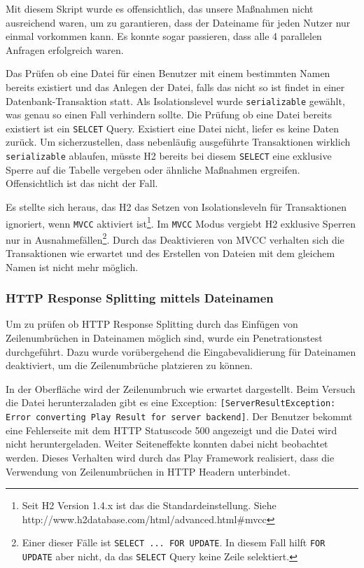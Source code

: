 \documentclass[12pt,DIV14,BCOR10mm,a4paper,parskip=half-,headsepline,headinclude,english,ngerman,bibliography=totocnumbered]{scrreprt}
\begin{document}
Mit diesem Skript wurde es offensichtlich, das unsere Maßnahmen nicht ausreichend waren, um zu garantieren, dass der Dateiname für jeden Nutzer nur einmal vorkommen kann. Es konnte sogar passieren, dass alle 4 parallelen Anfragen erfolgreich waren.

Das Prüfen ob eine Datei für einen Benutzer mit einem bestimmten Namen bereits existiert und das Anlegen der Datei, falls das nicht so ist findet in einer Datenbank-Transaktion statt. Als Isolationslevel wurde \texttt{serializable} gewählt, was genau so einen Fall verhindern sollte. Die Prüfung ob eine Datei bereits existiert ist ein \texttt{SELCET} Query. Existiert eine Datei nicht, liefer es keine Daten zurück. Um sicherzustellen, dass nebenläufig ausgeführte Transaktionen wirklich \texttt{serializable} ablaufen, müsste H2 bereits bei diesem \texttt{SELECT} eine exklusive Sperre auf die Tabelle vergeben oder ähnliche Maßnahmen ergreifen. Offensichtlich ist das nicht der Fall.

Es stellte sich heraus, das H2 das Setzen von Isolationsleveln für Transaktionen ignoriert, wenn \texttt{MVCC} aktiviert ist\footnote{Seit H2 Version 1.4.x ist das die Standardeinstellung. Siehe http://www.h2database.com/html/advanced.html\#mvcc}. Im \texttt{MVCC} Modus vergiebt  H2 exklusive Sperren nur in Ausnahmefällen\footnote{Einer dieser Fälle ist \texttt{SELECT ... FOR UPDATE}. In diesem Fall hilft \texttt{FOR UPDATE} aber nicht, da das \texttt{SELECT} Query keine Zeile selektiert.}. Durch das Deaktivieren von MVCC verhalten sich die Transaktionen wie erwartet und des Erstellen von Dateien mit dem gleichem Namen ist nicht mehr möglich.


\subsubsection{HTTP Response Splitting mittels Dateinamen}
Um zu prüfen ob HTTP Response Splitting durch das Einfügen von Zeilenumbrüchen in Dateinamen möglich sind, wurde ein Penetrationstest durchgeführt. Dazu wurde vorübergehend die Eingabevalidierung für Dateinamen deaktiviert, um die Zeilenumbrüche platzieren zu können.

In der Oberfläche wird der Zeilenumbruch wie erwartet dargestellt. Beim Versuch die Datei herunterzaladen gibt es eine Exception: \texttt{[ServerResultException: Error converting Play Result for server backend]}. Der Benutzer bekommt eine Fehlerseite mit dem HTTP Statuscode 500 angezeigt und die Datei wird nicht heruntergeladen. Weiter Seiteneffekte konnten dabei nicht beobachtet werden. Dieses Verhalten wird durch das Play Framework realisiert, dass die Verwendung von Zeilenumbrüchen in HTTP Headern unterbindet.
\end{document}
